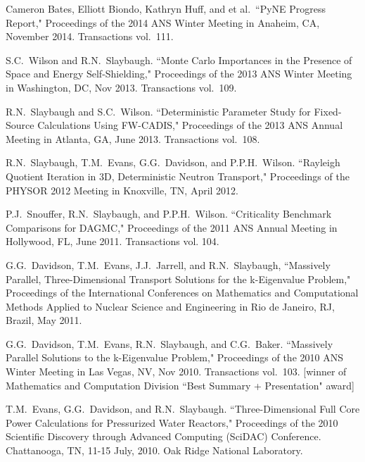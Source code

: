 \begin{bibsection}
\item Cameron Bates, Elliott Biondo, Kathryn Huff, and et al.\ ``PyNE Progress Report," Proceedings of the 2014 ANS Winter Meeting in Anaheim, CA, November 2014. Transactions vol.\ 111.

\item S.C.\ Wilson and R.N.\ Slaybaugh. ``Monte Carlo Importances in the Presence of Space and Energy Self-Shielding," Proceedings of the 2013 ANS Winter Meeting in Washington, DC, Nov 2013. Transactions vol.\ 109.

\item R.N.\ Slaybaugh and  S.C.\ Wilson. ``Deterministic Parameter Study for Fixed-Source Calculations Using FW-CADIS," Proceedings of the 2013 ANS Annual Meeting in Atlanta, GA, June 2013. Transactions vol.\ 108.

\item R.N.\ Slaybaugh, T.M.\ Evans, G.G.\ Davidson, and P.P.H.\ Wilson. ``Rayleigh Quotient Iteration in 3D, Deterministic Neutron Transport," Proceedings of the PHYSOR 2012 Meeting in Knoxville, TN, April 2012.

\item P.J.\ Snouffer, R.N.\ Slaybaugh, and P.P.H.\ Wilson. ``Criticality Benchmark Comparisons for DAGMC," Proceedings of the 2011 ANS Annual Meeting in Hollywood, FL, June 2011. Transactions vol. 104.

\item G.G.\ Davidson, T.M.\ Evans, J.J.\ Jarrell, and R.N.\ Slaybaugh, ``Massively Parallel, Three-Dimensional Transport Solutions for the k-Eigenvalue Problem," Proceedings of the International Conferences on Mathematics and Computational Methods Applied to Nuclear Science and Engineering in Rio de Janeiro, RJ, Brazil, May 2011.

\item G.G.\ Davidson, T.M.\ Evans, R.N.\ Slaybaugh, and C.G.\ Baker.  ``Massively Parallel Solutions to the k-Eigenvalue Problem," Proceedings of the 2010 ANS Winter Meeting in Las Vegas, NV, Nov 2010. Transactions vol.\ 103. [winner of Mathematics and Computation Division ``Best Summary + Presentation" award]

\item T.M.\ Evans, G.G.\ Davidson, and R.N.\ Slaybaugh.  ``Three-Dimensional Full Core Power Calculations for Pressurized Water Reactors," Proceedings of the 2010 Scientific Discovery through Advanced Computing (SciDAC) Conference. Chattanooga, TN, 11-15 July, 2010. Oak Ridge National Laboratory.


\end{bibsection}
